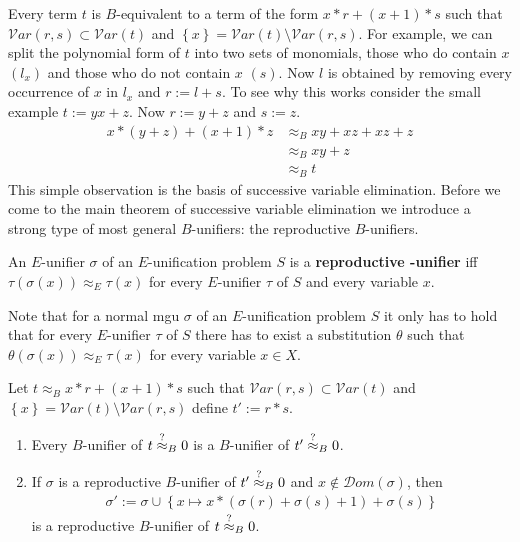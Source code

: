 	Every term $t$ is $B$-equivalent to a term of the form $x*r+(x+1)*s$ such that $\mathcal{V}ar(r,s)\subset\mathcal{V}ar(t)$ and $\left\lbrace x\right\rbrace =\mathcal{V}ar(t)\setminus\mathcal{V}ar(r,s)$. For example, we can split the polynomial form of $t$ into two sets of monomials, those who do contain $x$  $\left(l_x\right)$ and those who do not contain $x$ $(s)$. Now $l$ is obtained by removing every occurrence of $x$ in $l_x$ and $r:=l+s$. To see why this works consider the small example $t:=yx+z$. Now $r:=y+z$ and $s:=z$.
	\begin{align*}
		x*(y+z)+(x+1)*z & \approx_B xy+xz+xz+z \\
		                & \approx_B xy+z       \\
		                & \approx_B t          
	\end{align*}
	This simple observation is the basis of successive variable elimination.
	Before we come to the main theorem of successive variable elimination we introduce a strong type of most general $B$-unifiers: the reproductive $B$-unifiers.
	\begin{definition}
		An $E$-unifier $\sigma$ of an $E$-unification problem $S$ is a \textbf{reproductive \mBold-unifier} iff $\tau(\sigma(x))\approx_E\tau(x)$ for every $E$-unifier $\tau$ of $S$ and every variable $x$.
	\end{definition}
	Note that for a normal mgu $\sigma$ of an $E$-unification problem $S$ it only has to hold that for every $E$-unifier $\tau$ of $S$ there has to exist a substitution $\theta$ such that $\theta(\sigma(x))\approx_E\tau(x)$ for every variable $x\in X$. 
	\begin{theorem}\label{sucVEli}
		Let $t\approx_B x*r+(x+1)*s$ such that $\mathcal{V}ar(r,s)\subset\mathcal{V}ar(t)$ and $\left\lbrace x\right\rbrace =\mathcal{V}ar(t)\setminus\mathcal{V}ar(r,s)$ define $t':=r*s$.
		\begin{enumerate}
			\item Every $B$-unifier of $t\stackrel{?}{\approx}_B0$ is a $B$-unifier of $t'\stackrel{?}{\approx}_B0$.
			\item If $\sigma$ is a reproductive $B$-unifier of $t'\stackrel{?}{\approx}_B0$ and $x\notin\mathcal{D}om(\sigma)$, then 
			      \begin{align*}
			      	\sigma':=\sigma\cup\left\lbrace x\mapsto x*(\sigma(r)+\sigma(s)+1)+\sigma(s)\right\rbrace 
			      \end{align*}
			      is a reproductive $B$-unifier of $t\stackrel{?}{\approx}_B0$.
		\end{enumerate}
	\end{theorem}
